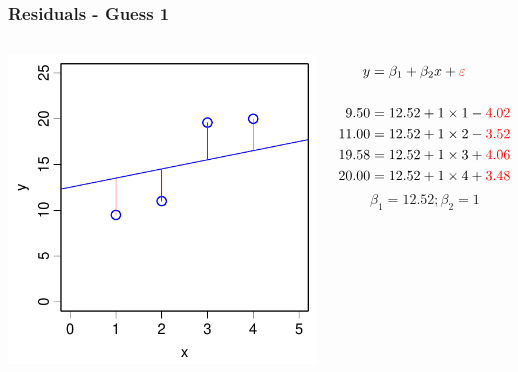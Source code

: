 \documentclass[aspectratio=43]{beamer}
\begin{document}
\frame
{\frametitle{Residuals - Guess 1}
 \begin{columns}[T]

		\includegraphics[width=\textwidth]{TooFlat.pdf}
		
		\begin{align*}
		  y  &= \beta_1 + \beta_2 x  + {\color{red} \varepsilon }\\
		  \\
		  9.50  &= 12.52 + 1 \times 1 - {\color{red} 4.02}\\
		  11.00 &= 12.52 + 1 \times 2 - {\color{red} 3.52}\\
		  19.58 &= 12.52 + 1 \times 3 + {\color{red} 4.06}\\
		  20.00 &= 12.52 + 1 \times 4 + {\color{red} 3.48} 
		\end{align*}
		\[\beta_1 = 12.52; \beta_2=1\]

\end{columns}
}
\end{document}
